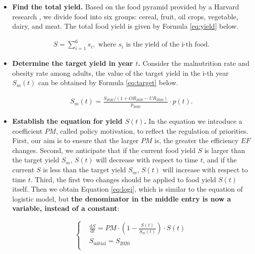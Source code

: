 \documentclass[12pt]{article}
\begin{document}
\begin{itemize}
    \item \textbf{Find the total yield.} Based on the food pyramid provided by a Harvard research \cite{cite:Food_pyramid}, we divide food into six groups: cereal, fruit, oil crops, vegetable, dairy, and meat. The total food yield is given by Formula \eqref{eq:yield} below.
    
    \begin{align}
        \label{eq:yield} S = \sum^6_{i=1}s_i, \text{ where }s_i\text{ is the yield of the i-th food.}
    \end{align}
    
    \item \textbf{Determine the target yield in year $t$.} Consider the malnutrition rate and obesity rate among adults, the value of the target yield in the i-th year $S_m(t)$ can be obtained by Formula \eqref{eq:target} below.
    
    \begin{align}
        \label{eq:target} S_m(t) = \frac{S_{2020}/(1+OR_{2020}-UR_{2020})}{p_{2020}}\cdot p(t).
    \end{align}
    
    \item \textbf{Establish the equation for yield $S(t)$.} In the equation we introduce a coefficient $PM$, called policy motivation, to reflect the regulation of priorities. First, our aim is to ensure that the larger $PM$ is, the greater the efficiency $EF$ changes. Second, we anticipate that if the current food yield $S$ is larger than the target yield $S_m$, $S(t)$ will decrease with respect to time $t$, and if the current $S$ is less than the target yield $S_m$, $S(t)$ will increase with respect to time $t$. Third, the first two changes should be applied to food yield $S(t)$ itself. Then we obtain Equation \eqref{eq:logi}, which is similar to the equation of logistic model, but \textbf{the denominator in the middle entry is now a variable, instead of a constant}: 
    
    
    \begin{equation}
    \left\{
    \begin{aligned}
        \label{eq:logi} & \frac{\mathrm{d} S}{\mathrm{d} t} = PM\cdot  (1-\frac{S(t)}{S_m(t)})\cdot S(t) \\
        & S_{\text{initial}}  =  S_{2020} \\ 
    \end{aligned}
    \right.
    \end{equation}


\end{itemize}
\end{document}
